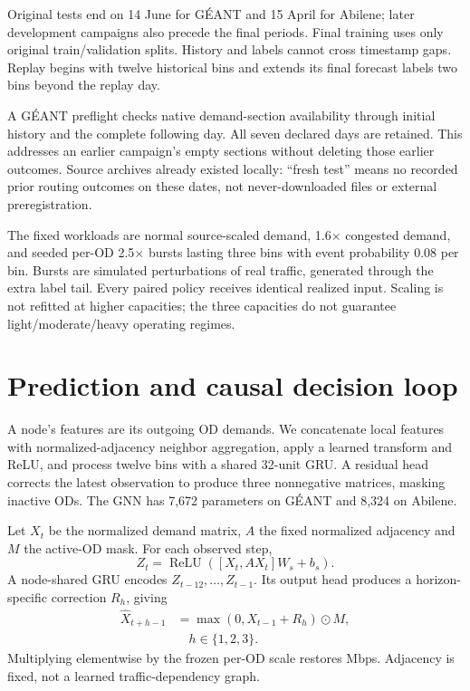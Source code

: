 \documentclass[conference,letterpaper]{IEEEtran}
\begin{document}
Original tests end on 14 June for GÉANT and 15 April for Abilene; later development campaigns also precede the final periods. Final training uses only original train/validation splits. History and labels cannot cross timestamp gaps. Replay begins with twelve historical bins and extends its final forecast labels two bins beyond the replay day.

A GÉANT preflight checks native demand-section availability through initial history and the complete following day. All seven declared days are retained. This addresses an earlier campaign's empty sections without deleting those earlier outcomes. Source archives already existed locally: ``fresh test'' means no recorded prior routing outcomes on these dates, not never-downloaded files or external preregistration.

The fixed workloads are normal source-scaled demand, 1.6$\times$ congested demand, and seeded per-OD 2.5$\times$ bursts lasting three bins with event probability 0.08 per bin. Bursts are simulated perturbations of real traffic, generated through the extra label tail. Every paired policy receives identical realized input. Scaling is not refitted at higher capacities; the three capacities do not guarantee light/moderate/heavy operating regimes.

\section{Prediction and causal decision loop}

A node's features are its outgoing OD demands. We concatenate local features with normalized-adjacency neighbor aggregation, apply a learned transform and ReLU, and process twelve bins with a shared 32-unit GRU. A residual head corrects the latest observation to produce three nonnegative matrices, masking inactive ODs. The GNN has 7,672 parameters on GÉANT and 8,324 on Abilene.

Let $X_t$ be the normalized demand matrix, $A$ the fixed normalized
adjacency and $M$ the active-OD mask. For each observed step,
\begin{equation}
 Z_t = \operatorname{ReLU}([X_t,AX_t]W_s+b_s).
\end{equation}
A node-shared GRU encodes $Z_{t-12},\ldots,Z_{t-1}$. Its output head produces
a horizon-specific correction $R_h$, giving
\begin{equation}
\begin{split}
 \widehat X_{t+h-1}&=\max(0,X_{t-1}+R_h)\odot M,\\
 &\hspace{1em}h\in\{1,2,3\}.
\end{split}
\end{equation}
Multiplying elementwise by the frozen per-OD scale restores Mbps.
Adjacency is fixed, not a learned traffic-dependency graph.
\end{document}
